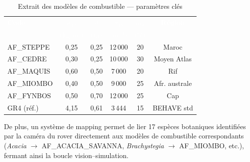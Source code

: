 \documentclass[a4paper,12pt,openany,titlepage]{scrartcl}
\begin{document}
\begin{table}[H]
\centering
\caption{Extrait des modèles de combustible --- paramètres clés}
\label{tab:fuel_models}
\begin{tabular}{|l|c|c|c|c|c|}
\hline
\rowcolor{NavyBlue} \textcolor{white}{\textbf{Code}} & \textcolor{white}{\textbf{$w_{1h}$}} & \textcolor{white}{\textbf{$\delta$}} & \textcolor{white}{\textbf{$\sigma_{1h}$}} & \textcolor{white}{\textbf{$m_x$}} & \textcolor{white}{\textbf{Région}} \\
\rowcolor{NavyBlue}  & \textcolor{white}{(kg/m²)} & \textcolor{white}{(m)} & \textcolor{white}{($\text{m}^{-1}$)} & \textcolor{white}{(\%)} & \\
\hline
AF\_STEPPE & 0,25 & 0,25 & 12\,000 & 20 & Maroc \\
AF\_CEDRE & 0,30 & 0,25 & 10\,000 & 30 & Moyen Atlas \\
AF\_MAQUIS & 0,60 & 0,50 & 7\,000 & 20 & Rif \\
AF\_MIOMBO & 0,40 & 0,50 & 9\,000 & 25 & Afr. australe \\
AF\_FYNBOS & 0,50 & 0,70 & 12\,000 & 25 & Cap \\
GR4 (réf.) & 4,15 & 0,61 & 3\,444 & 15 & BEHAVE std \\
\hline
\end{tabular}
\end{table}

De plus, un système de mapping permet de lier 17 espèces botaniques identifiées par la caméra du rover directement aux modèles de combustible correspondants (\textit{Acacia} $\rightarrow$ AF\_ACACIA\_SAVANNA, \textit{Brachystegia} $\rightarrow$ AF\_MIOMBO, etc.), fermant ainsi la boucle vision--simulation.


\end{document}
